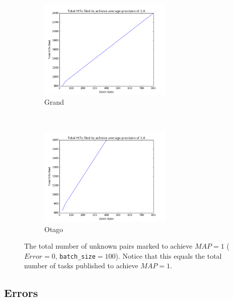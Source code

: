 \begin{figure}[htbp]
  \centering
  \begin{subfigure}[t]{\textwidth}
      \centering
      \includegraphics[width=0.7\textwidth]{sizes/grtotal}
      \caption{Grand}
  \end{subfigure}%
  ~ \\
    \begin{subfigure}[t]{\textwidth}
      \centering
      \includegraphics[width=0.7\textwidth]{sizes/ottotal}
      \caption{Otago}
  \end{subfigure}%
  \captionsetup{justification=centering}
  \caption{The total number of unknown pairs marked to achieve $MAP=1$
  ($Error=0$, \texttt{batch\_size}$=100$). Notice that this equals the total 
  number of tasks published to achieve $MAP=1$. }
  \label{fig:sizes_curves} %
\end{figure}


\subsection{Errors} %
\label{sub:errors}

